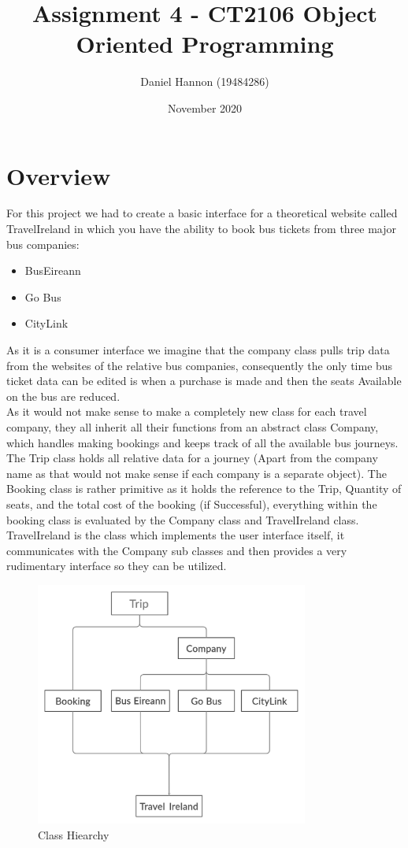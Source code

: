\documentclass{article}
\title{Assignment 4 - CT2106 Object Oriented Programming}
\author{Daniel Hannon (19484286)}
\date{November 2020}
\begin{document}
	\maketitle
	\section{Overview}
	For this project we had to create a basic interface for a theoretical website called TravelIreland in which you have the ability to book bus tickets from three major bus companies:
	\begin{itemize}
		\item BusEireann
		\item Go Bus
		\item CityLink
	\end{itemize}
	As it is a consumer interface we imagine that the company class pulls trip data from the websites of the relative bus companies, consequently the only time bus ticket data can be edited is when a purchase is made and then the seats Available on the bus are reduced.\\
	As it would not make sense to make a completely new class for each travel company, they all inherit all their functions from an abstract class Company, which handles making bookings and keeps track of all the available bus journeys.\\
	The Trip class holds all relative data for a journey (Apart from the company name as that would not make sense if each company is a separate object).
	The Booking class is rather primitive as it holds the reference to the Trip, Quantity of seats, and the total cost of the booking (if Successful), everything within the booking class is evaluated by the Company class and TravelIreland class.\\
	TravelIreland is the class which implements the user interface itself, it communicates with the Company sub classes and then provides a very rudimentary interface so they can be utilized.
	\begin{figure}[h!]
		\centering
		\includegraphics[width=0.8\textwidth]{hiearchy.png}
		\caption{Class Hiearchy}
	\end{figure}
\end{document}
